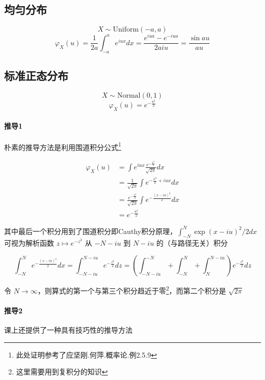 \documentclass[a4paper, 11pt]{article} %
\begin{document}
\subsection{均匀分布}

\begin{equation*}
	X\sim\text{Uniform}(-a,a)
\end{equation*}
\begin{equation*}
	\varphi_X(u)=\frac{1}{2a}\int_{-a}^ae^{iux}dx=\frac{e^{iua}-e^{-iua}}{2aiu}=\frac{\sin{au}}{au}
\end{equation*}

\subsection{标准正态分布}

$$
X\sim\text{Normal}(0,1)
$$
$$
\varphi_X(u)=e^{-\frac{u^2}{2}}
$$

\paragraph{推导1}

朴素的推导方法是利用围道积分公式\footnote{此处证明参考了应坚刚.何萍.概率论.例2.5.9}

\begin{align*}
\varphi_X(u)&=	\int e^{iux}\frac{e^{-\frac{x^2}{2}}}{\sqrt{2\pi}}dx \\
&=\frac{1}{\sqrt{2\pi}}\int e^{-\frac{x^2}{2}+iux}dx \\
&=\frac{e^{-\frac{u^2}{2}}}{\sqrt{2\pi}}\int e^{-\frac{(x-iu)^2}{2}}dx \\
&=e^{-\frac{u^2}{2}}
\end{align*}

其中最后一个积分用到了围道积分即Cauthy积分原理，$\int_{-N}^N\exp{(x-iu)^2/2}dx$ 可视为解析函数 $z\mapsto e^{-z^2}$ 从 $-N-iu$ 到 $N-iu$ 的（与路径无关）积分

$$
\int_{-N}^N e^{-\frac{(x-iu)^2}{2}}dx=\int_{-N-iu}^{N-iu}e^{-\frac{z^2}{2}}dz=(\int_{-N-iu}^{-N}+\int_{-N}^N+\int_N^{N-iu}) e^{-\frac{z^2}{2}}dz
$$

令 $N\to\infty$，则算式的第一个与第三个积分趋近于零\footnote{这里需要用到复积分的知识}，而第二个积分是 $\sqrt{2\pi}$

\paragraph{推导2}

课上还提供了一种具有技巧性的推导方法
\end{document}
